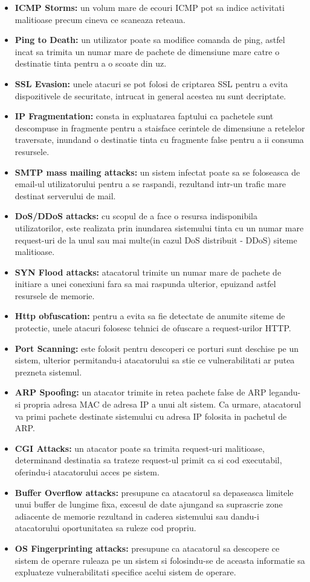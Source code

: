 \begin{itemize}
	\item \textbf{ICMP Storms:} un volum mare de ecouri ICMP pot sa indice activitati malitioase precum cineva ce scaneaza reteaua.
	\item \textbf{Ping to Death:} un utilizator poate sa modifice comanda de ping, astfel incat sa trimita un numar mare de pachete de dimensiune mare catre o destinatie tinta pentru a o scoate din uz.
	\item \textbf{SSL Evasion:} unele atacuri se pot folosi de criptarea SSL pentru a evita dispozitivele de securitate, intrucat in general acestea nu sunt decriptate.
	\item \textbf{IP Fragmentation:} consta in expluatarea faptului ca pachetele sunt descompuse in fragmente pentru a staisface cerintele de dimensiune a retelelor traversate, inundand o destinatie tinta cu fragmente false pentru a ii consuma resursele. 
	\item \textbf{SMTP mass mailing attacks:} un sistem infectat poate sa se foloseasca de email-ul utilizatorului pentru a se raspandi, rezultand intr-un trafic mare destinat serverului de mail.
	\item \textbf{DoS/DDoS attacks:} cu scopul de a face o resursa indisponibila utilizatorilor, este realizata prin inundarea sistemului tinta cu un numar mare request-uri de la unul sau mai multe(in cazul DoS distribuit - DDoS) siteme malitioase.
	\item \textbf{SYN Flood attacks:} atacatorul trimite un numar mare de pachete de initiare a unei conexiuni fara sa mai raspunda ulterior, epuizand astfel resursele de memorie.
	\item \textbf{Http obfuscation:} pentru a evita sa fie detectate de anumite siteme de protectie, unele atacuri folosesc tehnici de ofuscare a request-urilor HTTP.
	\item \textbf{Port Scanning:} este folosit pentru descoperi ce porturi sunt deschise pe un sistem, ulterior permitandu-i atacatorului sa stie ce vulnerabilitati ar putea prezneta sistemul.
	\item \textbf{ARP Spoofing:} un atacator trimite in retea pachete false de ARP legandu-si propria adresa MAC de adresa IP a unui alt sistem. Ca urmare, atacatorul va primi pachete destinate sistemului cu adresa IP folosita in pachetul de ARP.
	\item \textbf{CGI Attacks:} un atacator poate sa trimita request-uri malitioase, determinand destinatia sa trateze request-ul primit ca si cod executabil, oferindu-i atacatorului acces pe sistem.
	\item \textbf{Buffer Overflow attacks:} presupune ca atacatorul sa depaseasca limitele unui buffer de lungime fixa, excesul de date ajungand sa suprascrie zone adiacente de memorie rezultand in caderea sistemului sau dandu-i atacatorului oportunitatea sa ruleze cod propriu.
	\item \textbf{OS Fingerprinting attacks:} presupune ca atacatorul sa descopere ce sistem de operare ruleaza pe un sistem si folosindu-se de aceasta informatie sa expluateze vulnerabilitati specifice acelui sistem de operare.
\end{itemize}

